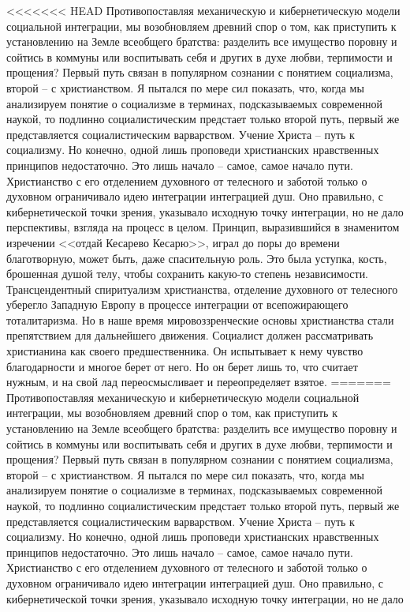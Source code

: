 \documentclass{book}
\begin{document}
<<<<<<< HEAD
Противопоставляя механическую и кибернетическую моде­ли социальной интеграции, мы возобновляем древний спор о том, как приступить к установлению на Земле всеобщего братст­ва: разделить все имущество поровну и сойтись в коммуны или воспитывать себя и других в духе любви, терпимости и про­щения? Первый путь связан в популярном сознании с понятием социализма, второй -- с христианством. Я пытался по мере сил показать, что, когда мы анализируем понятие о социализме в терминах, подсказываемых современной наукой, то подлинно социалистическим предстает только второй путь, первый же представляется социалистическим варварством. Учение Христа -- путь к социализму. Но конечно, одной лишь проповеди хри­стианских нравственных принципов недостаточно. Это лишь на­чало -- самое, самое начало пути. Христианство с его отделением духовного от телесного и заботой только о духовном ограничи­вало идею интеграции интеграцией душ. Оно правильно, с кибернетической точки зрения, указывало исходную точку интег­рации, но не дало перспективы, взгляда на процесс в целом. Принцип, выразившийся в знаменитом изречении <<отдай Кесарево Кесарю>>, играл до поры до времени благотворную, может быть, даже спасительную роль. Это была уступка, кость, брошен­ная душой телу, чтобы сохранить какую‑то степень независимости. Трансцендентный спиритуализм христианства, отделе­ние духовного от телесного уберегло Западную Европу в про­цессе интеграции от всепожирающего тоталитаризма. Но в наше время мировоззренческие основы христианства стали препятствием для дальнейшего движения. Социалист должен рассматривать христианина как своего предшественника. Он испытывает к нему чувство благодарности и многое берет от него. Но он берет лишь то, что считает нужным, и на свой лад переосмысливает и переопределяет взятое.
=======
Противопоставляя механическую и кибернетическую моде­ли социальной интеграции, мы возобновляем древний спор о том, как приступить к установлению на Земле всеобщего братст­ва: разделить все имущество поровну и сойтись в коммуны или воспитывать себя и других в духе любви, терпимости и про­щения? Первый путь связан в популярном сознании с понятием социализма, второй -- с христианством. Я пытался по мере сил показать, что, когда мы анализируем понятие о социализме в терминах, подсказываемых современной наукой, то подлинно социалистическим предстает только второй путь, первый же представляется социалистическим варварством. Учение Христа -- путь к социализму. Но конечно, одной лишь проповеди хри­стианских нравственных принципов недостаточно. Это лишь на­чало -- самое, самое начало пути. Христианство с его отделением духовного от телесного и заботой только о духовном ограничи­вало идею интеграции интеграцией душ. Оно правильно, с кибернетической точки зрения, указывало исходную точку интег­рации, но не дало 
\end{document}
